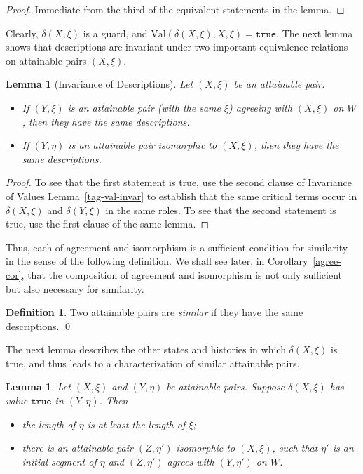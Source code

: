 \documentclass{LMCS}
\newtheorem{la}[thm]{Lemma}
\theoremstyle{definition}
\newtheorem{df}[thm]{Definition}
\newcommand{\ttt}[1]{\ensuremath{\mathtt {#1}}}
\newcommand{\val}[3]{\ensuremath{\text{Val}(#1,#2,#3)}}
\begin{document}
\begin{proof}
  Immediate from the third of the equivalent statements in the lemma.
\end{proof}

Clearly, $\delta(X,\xi)$ is a guard, and
$\val{\delta(X,\xi)}X\xi=\ttt{true}$.  The next lemma shows that
descriptions are invariant under two important equivalence relations
on attainable pairs $(X,\xi)$.

\begin{la}[Invariance of Descriptions] \label{invar-descr}
Let $(X,\xi)$ be an attainable pair.
\begin{itemize}
\item If $(Y,\xi)$ is an attainable pair (with the same $\xi$)
agreeing with $(X,\xi)$ on $W$, then they have the same
descriptions.
\item If $(Y,\eta)$ is an attainable pair isomorphic to $(X,\xi)$,
then they have the same descriptions.
\end{itemize}
\end{la}

\begin{proof} To see that the first statement is true, use the second
  clause of Invariance of Values Lemma~\ref{tag-val-invar} to
  establish that the same critical terms occur in
$\delta(X,\xi)$ and $\delta(Y,\xi)$ in the same roles. To see that the
second statement is true, use the first clause of the same lemma.
\end{proof}

Thus, each of agreement and isomorphism is a sufficient condition for
similarity in the sense of the following definition.  We shall see
later, in Corollary~\ref{agree-cor}, that the composition of agreement
and isomorphism is not only sufficient but also necessary for
similarity.

\begin{df} Two attainable pairs are \emph{similar} if they have the
  same descriptions.
\qed\end{df}

 The next lemma describes the other states and histories in which
$\delta(X,\xi)$ is true, and thus leads to a characterization of
similar attainable pairs.

\begin{la}   \label{agree-la}
Let $(X,\xi)$ and $(Y,\eta)$ be attainable pairs.  Suppose
$\delta(X,\xi)$ has value \ttt{true} in $(Y,\eta)$.  Then
\begin{itemize}
\item the length of $\eta$ is at least the length of $\xi$;
\item there is an attainable pair $(Z,\eta')$ isomorphic to $(X,\xi)$,
  such that $\eta'$ is an initial segment of $\eta$ and $(Z,\eta')$
  agrees with $(Y,\eta')$ on $W$.
\end{itemize}
\end{la}
\end{document}
